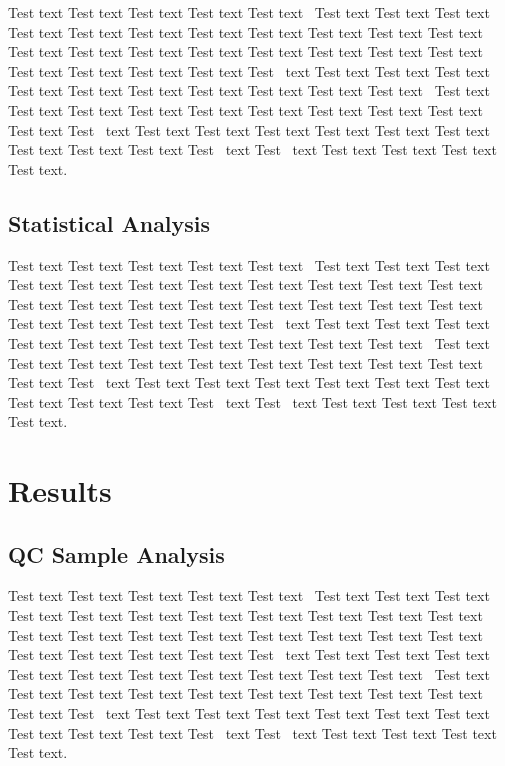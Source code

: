 \documentclass[animals,article,accept,moreauthors,pdftex]{Definitions/mdpi}
\begin{document}
Test text Test text Test text Test text Test text~\cite{B1-animals-4264543} Test text Test text Test text Test text Test text Test text Test text Test text Test text Test text Test text Test text Test text Test text Test text Test text Test text Test text Test text Test text Test text Test text Test text Test~\cite{B2-animals-4264543} text Test text Test text Test text Test text Test text Test text Test text Test text Test text Test text~\cite{B3-animals-4264543} Test text Test text Test text Test text Test text Test text Test text Test text Test text Test text Test~\cite{B4-animals-4264543} text Test text Test text Test text Test text Test text Test text Test text Test text Test text Test~\cite{B5-animals-4264543} text Test~\cite{B6-animals-4264543} text Test text Test text Test text Test text.


\subsection{Statistical Analysis \label{sect:sec2dot3-animals-4264543}}

Test text Test text Test text Test text Test text~\cite{B1-animals-4264543} Test text Test text Test text Test text Test text Test text Test text Test text Test text Test text Test text Test text Test text Test text Test text Test text Test text Test text Test text Test text Test text Test text Test text Test~\cite{B2-animals-4264543} text Test text Test text Test text Test text Test text Test text Test text Test text Test text Test text~\cite{B3-animals-4264543} Test text Test text Test text Test text Test text Test text Test text Test text Test text Test text Test~\cite{B4-animals-4264543} text Test text Test text Test text Test text Test text Test text Test text Test text Test text Test~\cite{B5-animals-4264543} text Test~\cite{B6-animals-4264543} text Test text Test text Test text Test text.


\section{Results \label{sect:sec3-animals-4264543}}

\subsection{QC Sample Analysis \label{sect:sec3dot1-animals-4264543}}

Test text Test text Test text Test text Test text~\cite{B1-animals-4264543} Test text Test text Test text Test text Test text Test text Test text Test text Test text Test text Test text Test text Test text Test text Test text Test text Test text Test text Test text Test text Test text Test text Test text Test~\cite{B2-animals-4264543} text Test text Test text Test text Test text Test text Test text Test text Test text Test text Test text~\cite{B3-animals-4264543} Test text Test text Test text Test text Test text Test text Test text Test text Test text Test text Test~\cite{B4-animals-4264543} text Test text Test text Test text Test text Test text Test text Test text Test text Test text Test~\cite{B5-animals-4264543} text Test~\cite{B6-animals-4264543} text Test text Test text Test text Test text.
\end{document}
